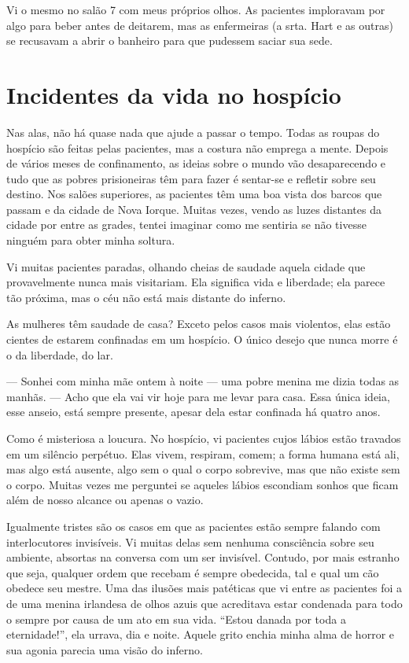 Vi o mesmo no salão 7 com meus próprios olhos. As pacientes imploravam
por algo para beber antes de deitarem, mas as enfermeiras (a srta. Hart
e as outras) se recusavam a abrir o banheiro para que pudessem saciar
sua sede.

\label{section-9}

\chapter{Incidentes da vida no
hospício}\label{capuxedtulo-xv-incidentes-da-vida-no-hospuxedcio}

Nas alas, não há quase nada que ajude a passar o tempo. Todas as roupas
do hospício são feitas pelas pacientes, mas a costura não emprega a
mente. Depois de vários meses de confinamento, as ideias sobre o mundo
vão desaparecendo e tudo que as pobres prisioneiras têm para fazer é
sentar-se e refletir sobre seu destino. Nos salões superiores, as
pacientes têm uma boa vista dos barcos que passam e da cidade de Nova
Iorque. Muitas vezes, vendo as luzes distantes da cidade por entre as
grades, tentei imaginar como me sentiria se não tivesse ninguém para
obter minha soltura.

Vi muitas pacientes paradas, olhando cheias de saudade aquela cidade que
provavelmente nunca mais visitariam. Ela significa vida e liberdade; ela
parece tão próxima, mas o céu não está mais distante do inferno.

As mulheres têm saudade de casa? Exceto pelos casos mais violentos, elas
estão cientes de estarem confinadas em um hospício. O único desejo que
nunca morre é o da liberdade, do lar.

--- Sonhei com minha mãe ontem à noite --- uma pobre menina me dizia
todas as manhãs. --- Acho que ela vai vir hoje para me levar para casa.
Essa única ideia, esse anseio, está sempre presente, apesar dela estar
confinada há quatro anos.

Como é misteriosa a loucura. No hospício, vi pacientes cujos lábios
estão travados em um silêncio perpétuo. Elas vivem, respiram, comem; a
forma humana está ali, mas algo está ausente, algo sem o qual o corpo
sobrevive, mas que não existe sem o corpo. Muitas vezes me perguntei se
aqueles lábios escondiam sonhos que ficam além de nosso alcance ou
apenas o vazio.

Igualmente tristes são os casos em que as pacientes estão sempre falando
com interlocutores invisíveis. Vi muitas delas sem nenhuma consciência
sobre seu ambiente, absortas na conversa com um ser invisível. Contudo,
por mais estranho que seja, qualquer ordem que recebam é sempre
obedecida, tal e qual um cão obedece seu mestre. Uma das ilusões mais
patéticas que vi entre as pacientes foi a de uma menina irlandesa de
olhos azuis que acreditava estar condenada para todo o sempre por causa
de um ato em sua vida. ``Estou danada por toda a eternidade!'', ela
urrava, dia e noite. Aquele grito enchia minha alma de horror e sua
agonia parecia uma visão do inferno.

